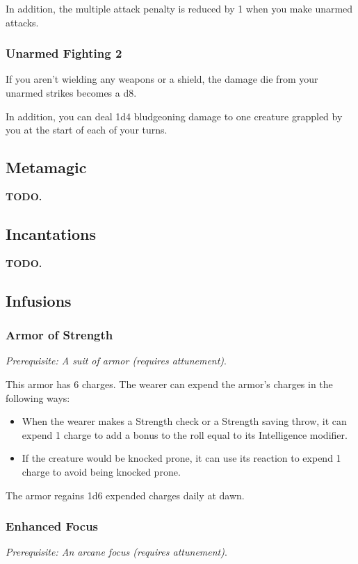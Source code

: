         In addition, the multiple attack penalty is reduced by 1 when you make unarmed attacks.
    \subsubsection{Unarmed Fighting 2}
        If you aren't wielding any weapons or a shield, the damage die from your unarmed strikes becomes a d8.

        In addition, you can deal 1d4 bludgeoning damage to one creature grappled by you at the start of each of your turns.

\subsection*{Metamagic} \label{ssec::metamagic}
    \textbf{TODO.} %

\subsection*{Incantations} \label{ssec::incantations}
    \textbf{TODO.} %

\subsection*{Infusions} \label{ssec::infusions}
    \subsubsection{Armor of Strength}
        \textit{Prerequisite: A suit of armor (requires attunement)}.

        This armor has 6 charges. The wearer can expend the armor's charges in the following ways:
        \begin{itemize}
            \item When the wearer makes a Strength check or a Strength saving throw, it can expend 1 charge to add a bonus to the roll equal to its Intelligence modifier.
            \item If the creature would be knocked prone, it can use its reaction to expend 1 charge to avoid being knocked prone.
        \end{itemize}
        The armor regains 1d6 expended charges daily at dawn.
    \subsubsection{Enhanced Focus}
        \textit{Prerequisite: An arcane focus (requires attunement)}.

